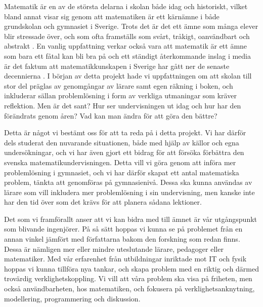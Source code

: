 \label{kapitel1} \textcolor{lila}{Matematik är en av de största delarna i skolan både idag och historiskt, vilket bland annat visar sig genom att matematiken är ett kärnämne i både grundskolan och gymnasiet i Sverige. Trots det är det ett ämne som många elever blir stressade över, och som ofta framställs som svårt, tråkigt, oanvändbart och abstrakt \cite{Ignacio&Barona}. En vanlig uppfattning verkar också vara att matematik är ett ämne som bara ett fåtal kan bli bra på \cite{Skolverket03} och ett ständigt återkommande inslag i media är det faktum att matematikkunskapen i Sverige har gått ner de senaste decennierna \cite{CompareOECD}.
I början av detta projekt hade vi uppfattningen om att skolan till stor del präglas av genomgångar av lärare samt egen räkning i boken, och inkluderar sällan problemlösning i form av verkliga utmaningar som kräver reflektion. Men är det sant? Hur ser undervisningen ut idag och hur har den förändrats genom åren? Vad kan man ändra för att göra den bättre?}

\textcolor{lila}{Detta är något vi bestämt oss för att ta reda på i detta projekt. Vi har därför dels studerat den nuvarande situationen, både med hjälp av källor och egna undersökningar, och vi har även gjort ett bidrag för att försöka förbättra den svenska matematikundervisningen. Detta vill vi göra genom att införa mer problemlösning i gymnasiet, och vi har därför skapat ett antal matematiska problem, tänkta att genomföras på gymnasienivå. Dessa ska kunna användas av lärare som vill inkludera mer problemlösning i sin undervisning, men kanske inte har den tid över som det krävs för att planera sådana lektioner.}

\textcolor{lila}{Det som vi framförallt anser att vi kan bidra med till ämnet är vår utgångspunkt som blivande ingenjörer. På så sätt hoppas vi kunna se på problemet från en annan vinkel jämfört med författarna bakom den forskning som redan finns. Dessa är nämligen mer eller mindre uteslutande lärare, pedagoger eller matematiker. Med vår erfarenhet från utbildningar inriktade mot IT och fysik hoppas vi kunna tillföra nya tankar, och skapa problem med en riktig och därmed trovärdig verklighetskoppling. Vi vill att våra problem ska visa på friheten, men också användbarheten, hos matematiken, och fokusera på verklighetsanknytning, modellering, programmering och diskussion.}
